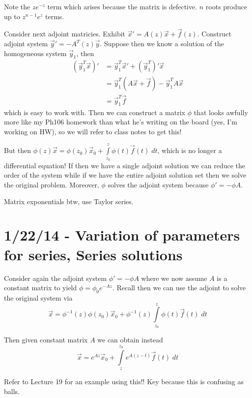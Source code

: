 \documentclass[10pt]{report}
\begin{document}
Note the $ze^{-z}$ term which arises because the matrix is defective. $n$ roots produce up to $z^{n-1}e^{z}$ terms.

Consider next adjoint matricies. Exhibit $\vec{x}' = A(z)\vec{x} + \vec{f}(z)$. Construct adjoint system $\vec{y}' = -A^T(z)\vec{y}$. Suppose then we know a solution of the homogeneous system $\vec{y}_1$, then
\begin{align}
    (\vec{y}_1^T\vec{x})' &= \vec{y}_1^T\vec{x}' + (\vec{y}_1^T)'\vec{x}\\
    &= \vec{y}_1^T(A\vec{x} + \vec{f}) - \vec{y}_1^TA\vec{x}\\
    &= \vec{y}_1^T\vec{f}
\end{align}
which is easy to work with. Then we can construct a matrix $\phi$ that looks awfully more like my Ph106 homework than what he's writing on the board (yes, I'm working on HW), so we will refer to class notes to get this!

But then $\phi(z)\vec{x} = \phi(z_0)\vec{x}_0 + \displaystyle\int\limits_{z_0}^{z}\phi(t)\vec{f}(t)\;dt$, which is no longer a differential equation! If then we have a single adjoint solution we can reduce the order of the system while if we have the entire adjoint solution set then we solve the original problem. Moreover, $\phi$ solves the adjoint system because $\phi' = -\phi A$. 

Matrix exponentials btw, use Taylor series.
\chapter{1/22/14 - Variation of parameters for series, Series solutions}

Consider again the adjoint system $\phi' = -\phi A$ where we now assume $A$ is a constant matrix to yield $\phi = \phi_0e^{-Az}$. Recall then we can use the adjoint to solve the original system via
\begin{equation}
    \vec{x} = \phi^{-1}(z)\phi(z_0)\vec{x}_0 + \phi^{-1}(z)\displaystyle\int\limits_{z_0}^{z}\phi(t)\vec{f}(t)\;dt
    \label{1.22.adjsol}
\end{equation}

Then given constant matrix $A$ we can obtain instead
\begin{equation}
    \vec{x} = e^{Az}\vec{x}_0 + \displaystyle\int\limits_{z}^{z_0}e^{A(z-t)}\vec{f}(t)\;dt
    \label{1.22.consta}
\end{equation}

Refer to Lecture 19 for an example using this!! Key because this is confusing as balls.
\end{document}
